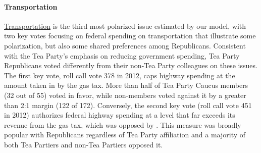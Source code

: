 \paragraph{Transportation}


\underline{Transportation} is the third most polarized issue estimated by our model, with two key votes focusing on federal spending on transportation that illustrate some polarization, but also some shared preferences among Republicans. Consistent with the Tea Party's emphasis on reducing government spending, Tea Party Republicans voted differently from their non-Tea Party colleagues on these issues. The first key vote, roll call vote 378 in 2012, caps highway spending at the amount taken in by the gas tax. More than half of Tea Party Caucus members (32 out of 55) voted in favor, while non-members voted against it by a greater than 2:1 margin (122 of 172). Conversely, the second key vote (roll call vote 451 in 2012) authorizes federal highway spending at a level that far exceeds its revenue from the gas tax, which was opposed by \fw{}.  This measure was broadly popular with Republicans regardless of Tea Party affiliation and a majority of both Tea Partiers and non-Tea Partiers opposed it.

